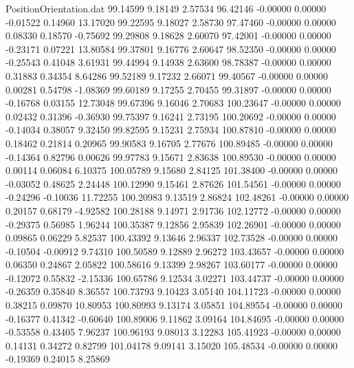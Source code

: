 \begin{filecontents}{PositionOrientation.dat}
  99.14599    9.18149    2.57534    96.42146   -0.00000    0.00000   -0.01522    0.14960   13.17020
  99.22595    9.18027    2.58730    97.47460   -0.00000    0.00000    0.08330    0.18570   -0.75692
  99.29808    9.18628    2.60070    97.42001   -0.00000    0.00000   -0.23171    0.07221   13.80584
  99.37801    9.16776    2.60647    98.52350   -0.00000    0.00000   -0.25543    0.41048    3.61931
  99.44994    9.14938    2.63600    98.78387   -0.00000    0.00000    0.31883    0.34354    8.64286
  99.52189    9.17232    2.66071    99.40567   -0.00000    0.00000    0.00281    0.54798   -1.08369
  99.60189    9.17255    2.70455    99.31897   -0.00000    0.00000   -0.16768    0.03155   12.73048
  99.67396    9.16046    2.70683   100.23647   -0.00000    0.00000    0.02432    0.31396   -0.36930
  99.75397    9.16241    2.73195   100.20692   -0.00000    0.00000   -0.14034    0.38057    9.32450
  99.82595    9.15231    2.75934   100.87810   -0.00000    0.00000    0.18462    0.21814    0.20965
  99.90583    9.16705    2.77676   100.89485   -0.00000    0.00000   -0.14364    0.82796    0.00626
  99.97783    9.15671    2.83638   100.89530   -0.00000    0.00000    0.00114    0.06084    6.10375
 100.05789    9.15680    2.84125   101.38400   -0.00000    0.00000   -0.03052    0.48625    2.24448
 100.12990    9.15461    2.87626   101.54561   -0.00000    0.00000   -0.24296   -0.10036   11.72255
 100.20983    9.13519    2.86824   102.48261   -0.00000    0.00000    0.20157    0.68179   -4.92582
 100.28188    9.14971    2.91736   102.12772   -0.00000    0.00000   -0.29375    0.56985    1.96244
 100.35387    9.12856    2.95839   102.26901   -0.00000    0.00000    0.09865    0.06229    5.82537
 100.43392    9.13646    2.96337   102.73528   -0.00000    0.00000   -0.10504   -0.00912    9.74310
 100.50589    9.12889    2.96272   103.43657   -0.00000    0.00000    0.06350    0.24867    2.05822
 100.58616    9.13399    2.98267   103.60177   -0.00000    0.00000   -0.12072    0.55832   -2.15336
 100.65786    9.12534    3.02271   103.44737   -0.00000    0.00000   -0.26359    0.35840    8.36557
 100.73793    9.10423    3.05140   104.11723   -0.00000    0.00000    0.38215    0.09870   10.80953
 100.80993    9.13174    3.05851   104.89554   -0.00000    0.00000   -0.16377    0.41342   -0.60640
 100.89006    9.11862    3.09164   104.84695   -0.00000    0.00000   -0.53558    0.43405    7.96237
 100.96193    9.08013    3.12283   105.41923   -0.00000    0.00000    0.14131    0.34272    0.82799
 101.04178    9.09141    3.15020   105.48534   -0.00000    0.00000   -0.19369    0.24015    8.25869

\end{filecontents}
